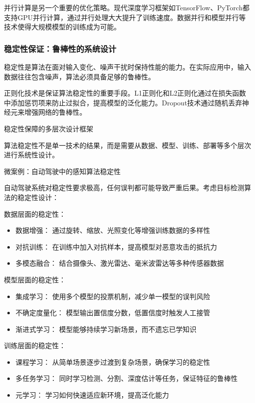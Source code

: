 并行计算是另一个重要的优化策略。现代深度学习框架如TensorFlow、PyTorch都支持GPU并行计算，通过并行处理大大提升了训练速度。数据并行和模型并行等技术使得大规模模型的训练成为可能。

\subsubsection{稳定性保证：鲁棒性的系统设计}

稳定性是算法在面对输入变化、噪声干扰时保持性能的能力。在实际应用中，输入数据往往包含噪声，算法必须具备足够的鲁棒性。

正则化技术是保证算法稳定性的重要手段。L1正则化和L2正则化通过在损失函数中添加惩罚项来防止过拟合，提高模型的泛化能力。Dropout技术通过随机丢弃神经元来增强网络的鲁棒性。

稳定性保障的多层次设计框架

算法稳定性不是单一技术的结果，而是需要从数据、模型、训练、部署等多个层次进行系统性设计。

微案例：自动驾驶中的感知算法稳定性

自动驾驶系统对稳定性要求极高，任何误判都可能导致严重后果。考虑目标检测算法的稳定性设计：

数据层面的稳定性：
\begin{itemize}
\item 数据增强： 通过旋转、缩放、光照变化等增强训练数据的多样性
\item 对抗训练： 在训练中加入对抗样本，提高模型对恶意攻击的抵抗力
\item 多模态融合： 结合摄像头、激光雷达、毫米波雷达等多种传感器数据
\end{itemize}

模型层面的稳定性：
\begin{itemize}
\item 集成学习： 使用多个模型的投票机制，减少单一模型的误判风险
\item 不确定度量化： 模型输出置信度分数，低置信度时触发人工接管
\item 渐进式学习： 模型能够持续学习新场景，而不遗忘已学知识
\end{itemize}

训练层面的稳定性：
\begin{itemize}
\item 课程学习： 从简单场景逐步过渡到复杂场景，确保学习的稳定性
\item 多任务学习： 同时学习检测、分割、深度估计等任务，保证特征的鲁棒性
\item 元学习： 学习如何快速适应新环境，提高泛化能力
\end{itemize}

